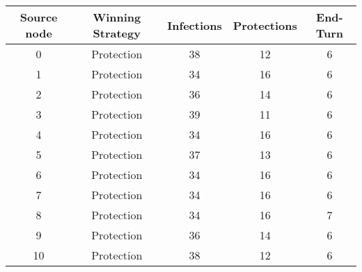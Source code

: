 \documentclass[results.tex]{subfiles}
\begin{document}
    \begin{center}
        \begin{tabular}{| c || c | c | c | c |}
            \hline
            {\bfseries Source node} & {\bfseries Winning Strategy} & {\bfseries Infections} & {\bfseries Protections}
            & {\bfseries End-Turn}
            \\  %
            \hline\hline
            0                       & Protection                   & 38                     & 12                      & 6                    \\
            \hline
            1                       & Protection                   & 34                     & 16                      & 6                    \\
            \hline
            2                       & Protection                   & 36                     & 14                      & 6                    \\
            \hline
            3                       & Protection                   & 39                     & 11                      & 6                    \\
            \hline
            4                       & Protection                   & 34                     & 16                      & 6                    \\
            \hline
            5                       & Protection                   & 37                     & 13                      & 6                    \\
            \hline
            6                       & Protection                   & 34                     & 16                      & 6                    \\
            \hline
            7                       & Protection                   & 34                     & 16                      & 6                    \\
            \hline
            8                       & Protection                   & 34                     & 16                      & 7                    \\
            \hline
            9                       & Protection                   & 36                     & 14                      & 6                    \\
            \hline
            10                      & Protection                   & 38                     & 12                      & 6                    \\

\end{tabular}
\end{center}
\end{document}
